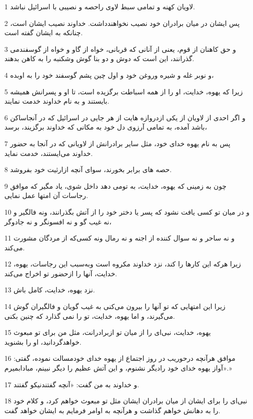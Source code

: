 \par 1 لاویان کهنه و تمامی سبط لاوی راحصه و نصیبی با اسرائیل نباشد.
\par 2 پس ایشان در میان برادران خود نصیب نخواهندداشت. خداوند نصیب ایشان است، چنانکه به ایشان گفته است.
\par 3 و حق کاهنان از قوم، یعنی از آنانی که قربانی، خواه از گاو و خواه از گوسفندمی گذرانند، این است که دوش و دو بنا گوش وشکنبه را به کاهن بدهند.
\par 4 و نوبر غله و شیره وروغن خود و اول چین پشم گوسفند خود را به اوبده،
\par 5 زیرا که یهوه، خدایت، او را از همه اسباطت برگزیده است، تا او و پسرانش همیشه بایستند و به نام خداوند خدمت نمایند.
\par 6 و اگر احدی از لاویان از یکی ازدروازه هایت از هر جایی در اسرائیل که در آنجاساکن باشد آمده، به تمامی آرزوی دل خود به مکانی که خداوند برگزیند، برسد،
\par 7 پس به نام یهوه خدای خود، مثل سایر برادرانش از لاویانی که در آنجا به حضور خداوند می‌ایستند، خدمت نماید.
\par 8 حصه های برابر بخورند، سوای آنچه ازارثیت خود بفروشد.
\par 9 چون به زمینی که یهوه، خدایت، به تومی دهد داخل شوی، یاد مگیر که موافق رجاسات آن امتها عمل نمایی.
\par 10 و در میان تو کسی یافت نشود که پسر یا دختر خود را از آتش بگذرانند، ونه فالگیر و نه غیب گو و نه افسونگر و نه جادوگر،
\par 11 و نه ساحر و نه سوال کننده از اجنه و نه رمال ونه کسی‌که از مردگان مشورت می‌کند.
\par 12 زیرا هرکه این کارها را کند، نزد خداوند مکروه است وبه‌سبب این رجاسات، یهوه، خدایت، آنها را ازحضور تو اخراج می‌کند.
\par 13 نزد یهوه، خدایت، کامل باش.
\par 14 زیرا این امتهایی که تو آنها را بیرون می‌کنی به غیب گویان و فالگیران گوش می‌گیرند، و اما یهوه، خدایت، تو را نمی گذارد که چنین بکنی.
\par 15 یهوه، خدایت، نبی‌ای را از میان تو ازبرادرانت، مثل من برای تو مبعوث خواهدگردانید، او را بشنوید.
\par 16 موافق هر‌آنچه درحوریب در روز اجتماع از یهوه خدای خودمسالت نموده، گفتی: «آواز یهوه خدای خود رادیگر نشنوم، و این آتش عظیم را دیگر نبینم، مبادابمیرم.»
\par 17 و خداوند به من گفت: «آنچه گفتندنیکو گفتند.
\par 18 نبی‌ای را برای ایشان از میان برادران ایشان مثل تو مبعوث خواهم کرد، و کلام خود را به دهانش خواهم گذاشت و هر‌آنچه به اوامر فرمایم به ایشان خواهد گفت.
